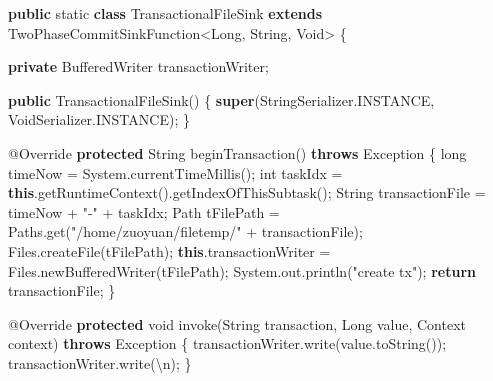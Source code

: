 \documentclass[cn,11pt,chinese]{elegantbook}
\newenvironment{Shaded}{}{}
\newcommand{\AttributeTok}[1]{\textcolor[rgb]{0.49,0.56,0.16}{#1}}
\newcommand{\BuiltInTok}[1]{#1}
\newcommand{\CharTok}[1]{\textcolor[rgb]{0.25,0.44,0.63}{#1}}
\newcommand{\DataTypeTok}[1]{\textcolor[rgb]{0.56,0.13,0.00}{#1}}
\newcommand{\FunctionTok}[1]{\textcolor[rgb]{0.02,0.16,0.49}{#1}}
\newcommand{\KeywordTok}[1]{\textcolor[rgb]{0.00,0.44,0.13}{\textbf{#1}}}
\newcommand{\NormalTok}[1]{#1}
\newcommand{\StringTok}[1]{\textcolor[rgb]{0.25,0.44,0.63}{#1}}
\begin{document}
\begin{Shaded}
\begin{Highlighting}[]
\KeywordTok{public} \DataTypeTok{static} \KeywordTok{class}\NormalTok{ TransactionalFileSink }\KeywordTok{extends}\NormalTok{ TwoPhaseCommitSinkFunction\textless{}}\BuiltInTok{Long}\NormalTok{, }\BuiltInTok{String}\NormalTok{, }\BuiltInTok{Void}\NormalTok{\textgreater{} \{}

    \KeywordTok{private} \BuiltInTok{BufferedWriter}\NormalTok{ transactionWriter;}

    \KeywordTok{public} \FunctionTok{TransactionalFileSink}\NormalTok{() \{}
        \KeywordTok{super}\NormalTok{(StringSerializer.}\FunctionTok{INSTANCE}\NormalTok{, VoidSerializer.}\FunctionTok{INSTANCE}\NormalTok{);}
\NormalTok{    \}}

    \AttributeTok{@Override}
    \KeywordTok{protected} \BuiltInTok{String} \FunctionTok{beginTransaction}\NormalTok{() }\KeywordTok{throws} \BuiltInTok{Exception}\NormalTok{ \{}
        \DataTypeTok{long}\NormalTok{ timeNow = }\BuiltInTok{System}\NormalTok{.}\FunctionTok{currentTimeMillis}\NormalTok{();}
        \DataTypeTok{int}\NormalTok{ taskIdx = }\KeywordTok{this}\NormalTok{.}\FunctionTok{getRuntimeContext}\NormalTok{().}\FunctionTok{getIndexOfThisSubtask}\NormalTok{();}
        \BuiltInTok{String}\NormalTok{ transactionFile = timeNow + }\StringTok{"{-}"}\NormalTok{ + taskIdx;}
\NormalTok{        Path tFilePath = Paths.}\FunctionTok{get}\NormalTok{(}\StringTok{"/home/zuoyuan/filetemp/"}\NormalTok{ + transactionFile);}
\NormalTok{        Files.}\FunctionTok{createFile}\NormalTok{(tFilePath);}
        \KeywordTok{this}\NormalTok{.}\FunctionTok{transactionWriter}\NormalTok{ = Files.}\FunctionTok{newBufferedWriter}\NormalTok{(tFilePath);}
        \BuiltInTok{System}\NormalTok{.}\FunctionTok{out}\NormalTok{.}\FunctionTok{println}\NormalTok{(}\StringTok{"create tx"}\NormalTok{);}
        \KeywordTok{return}\NormalTok{ transactionFile;}
\NormalTok{    \}}

    \AttributeTok{@Override}
    \KeywordTok{protected} \DataTypeTok{void} \FunctionTok{invoke}\NormalTok{(}\BuiltInTok{String}\NormalTok{ transaction, }\BuiltInTok{Long}\NormalTok{ value, }\BuiltInTok{Context}\NormalTok{ context) }\KeywordTok{throws} \BuiltInTok{Exception}\NormalTok{ \{}
\NormalTok{        transactionWriter.}\FunctionTok{write}\NormalTok{(value.}\FunctionTok{toString}\NormalTok{());}
\NormalTok{        transactionWriter.}\FunctionTok{write}\NormalTok{(}\CharTok{\textquotesingle{}\textbackslash{}n\textquotesingle{}}\NormalTok{);}
\NormalTok{    \}}


\end{Highlighting}
\end{Shaded}
\end{document}
